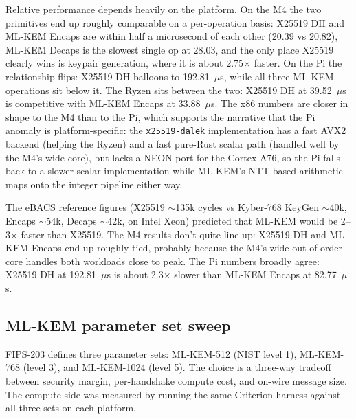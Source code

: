 \documentclass[11pt,a4paper]{article}
\begin{document}
Relative performance depends heavily on the platform. On the M4 the two primitives end up roughly comparable on a per-operation basis: X25519 DH and ML-KEM Encaps are within half a microsecond of each other (20.39 vs 20.82), ML-KEM Decaps is the slowest single op at 28.03, and the only place X25519 clearly wins is keypair generation, where it is about 2.75$\times$ faster. On the Pi the relationship flips: X25519 DH balloons to 192.81~$\mu$s, while all three ML-KEM operations sit below it. The Ryzen sits between the two: X25519 DH at 39.52~$\mu$s is competitive with ML-KEM Encaps at 33.88~$\mu$s. The x86 numbers are closer in shape to the M4 than to the Pi, which supports the narrative that the Pi anomaly is platform-specific: the \texttt{x25519-dalek} implementation has a fast AVX2 backend (helping the Ryzen) and a fast pure-Rust scalar path (handled well by the M4's wide core), but lacks a NEON port for the Cortex-A76, so the Pi falls back to a slower scalar implementation while ML-KEM's NTT-based arithmetic maps onto the integer pipeline either way.

The eBACS reference figures (X25519 $\sim$135k cycles vs Kyber-768 KeyGen $\sim$40k, Encaps $\sim$54k, Decaps $\sim$42k, on Intel Xeon) predicted that ML-KEM would be 2--3$\times$ faster than X25519. The M4 results don't quite line up: X25519 DH and ML-KEM Encaps end up roughly tied, probably because the M4's wide out-of-order core handles both workloads close to peak. The Pi numbers broadly agree: X25519 DH at 192.81~$\mu$s is about 2.3$\times$ slower than ML-KEM Encaps at 82.77~$\mu$s.

\subsection{ML-KEM parameter set sweep}
\label{sec:eval_paramsweep}

FIPS-203 defines three parameter sets: ML-KEM-512 (NIST level 1), ML-KEM-768 (level 3), and ML-KEM-1024 (level 5). The choice is a three-way tradeoff between security margin, per-handshake compute cost, and on-wire message size. The compute side was measured by running the same Criterion harness against all three sets on each platform.
\end{document}
